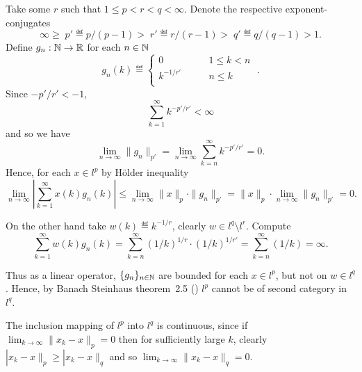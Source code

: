 \begin{enumerate}
\begin{itemize}
  Take some $r$ such that \(1\leq p<r<q<\infty\).
  Denote the respective exponent-conjugates
  \begin{equation*}
    \infty 
    \geq\; p' \eqdef p/(p-1)
    >\;    r' \eqdef r/(r-1) 
    >\;    q' \eqdef q/(q-1) 
    > 1.
  \end{equation*}
  Define \(g_n:\mathbb{N}\to\mathbb{R}\) for each \(n\in\mathbb{N}\) 
  \begin{equation*}
  g_n(k) \eqdef \left\{\begin{array}{ll}
                       0          & \qquad 1 \leq k < n \\
                       k^{-1/r'}  & \qquad n \leq k  \\
                       \end{array}\right.\;.
  \end{equation*}
  Since \(-p'/r' < -1\),
  \begin{equation*}
  \sum_{k=1}^\infty k^{-p'/r'} < \infty
  \end{equation*}
  and so we have
  \begin{equation*}
  \lim_{n\to\infty} \|g_n\|_{p'} 
  = \lim_{n\to\infty} \sum_{k=n}^\infty k^{-p'/r'} = 0.
  \end{equation*}
  Hence, for each \(x\in l^p\) by H\"older inequality
  \begin{equation*}
  \lim_{n\to\infty} \left| \sum_{k=1}^\infty x(k)g_n(k) \right|
  \leq \lim_{n\to\infty} \|x\|_p \cdot \|g_n\|_{p'}
  = \|x\|_p \cdot \lim_{n\to\infty} \|g_n\|_{p'}
  = 0.
  \end{equation*}

  On the other hand take \(w(k) \eqdef k^{-1/r}\), clearly
  \(w \in l^q \setminus l^r\). Compute
  \begin{equation*}
       \sum_{k=1}^\infty w(k)g_n(k) 
  =    \sum_{k=n}^\infty (1/k)^{1/r} \cdot (1/k)^{1/r'}
  =    \sum_{k=n}^\infty (1/k)
  = \infty.
  \end{equation*}

  Thus as a linear operator, 
  \(\{g_n\}_{n\in\mathbb{N}}\) are bounded for each \(x\in l^p\),
  but not on \(w\in l^q\).
  Hence, by Banach Steinhaus
  theorem~2.5 (\cite{RudinFA79}) \(l^p\) cannot be of second category
  in \(l^q\).

  The inclusion mapping of \(l^p\) into \(l^q\) is continuous,
  since if \(\lim_{k\to\infty}\|x_k - x\|_p = 0\) 
  then for sufficiently large $k$, clearly
  \(|x_k - x\|_p \geq |x_k - x\|_q\) and so 
  \(\lim_{k\to\infty}\|x_k - x\|_q = 0\).


\end{itemize}
\end{enumerate}
